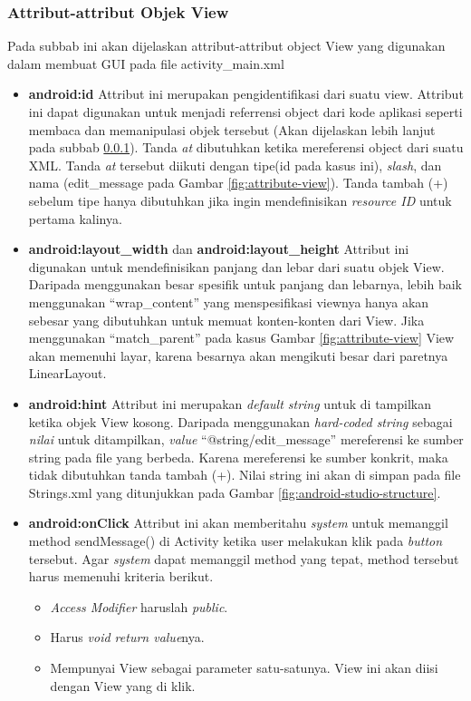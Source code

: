 \subsubsection{Attribut-attribut Objek View}
Pada subbab ini akan dijelaskan attribut-attribut object View yang digunakan dalam membuat GUI pada file activity\_main.xml
\begin{itemize}
	\item \textbf{android:id}
	Attribut ini merupakan pengidentifikasi dari suatu view. Attribut ini dapat digunakan untuk menjadi referrensi object dari kode aplikasi seperti membaca dan memanipulasi objek tersebut (Akan dijelaskan lebih lanjut pada subbab \ref{}). Tanda \textit{at} dibutuhkan ketika mereferensi object dari suatu XML. Tanda \textit{at} tersebut diikuti dengan tipe(id pada kasus ini), \textit{slash}, dan nama (edit\_message pada Gambar \ref{fig:attribute-view}). Tanda tambah (+) sebelum tipe hanya dibutuhkan jika ingin mendefinisikan \textit{resource ID} untuk pertama kalinya.
	\item \textbf{android:layout\_width} dan \textbf{android:layout\_height}
	Attribut ini digunakan untuk mendefinisikan panjang dan lebar dari suatu objek View. Daripada menggunakan besar spesifik untuk panjang dan lebarnya, lebih baik menggunakan "`wrap\_content"' yang menspesifikasi viewnya hanya akan sebesar yang dibutuhkan untuk memuat konten-konten dari View. Jika menggunakan "`match\_parent"' pada kasus Gambar \ref{fig:attribute-view} View akan memenuhi layar, karena besarnya akan mengikuti besar dari paretnya LinearLayout.
	\item \textbf{android:hint}
	Attribut ini merupakan \textit{default string} untuk di tampilkan ketika objek View kosong. Daripada menggunakan \textit{hard-coded string} sebagai \textit{nilai} untuk ditampilkan, \textit{value} "`@string/edit\_message"' mereferensi ke sumber string pada file yang berbeda. Karena mereferensi ke sumber konkrit, maka tidak dibutuhkan tanda tambah (+). Nilai string ini akan di simpan pada file Strings.xml yang ditunjukkan pada Gambar \ref{fig:android-studio-structure}.
	\item \textbf{android:onClick}
	Attribut ini akan memberitahu \textit{system} untuk memanggil method sendMessage() di Activity ketika user melakukan klik pada \textit{button} tersebut. Agar \textit{system} dapat memanggil method yang tepat, method tersebut harus memenuhi kriteria berikut.
	\begin{itemize}
		\item \textit{Access Modifier} haruslah \textit{public}.
		\item Harus \textit{void return value}nya.
		\item Mempunyai View sebagai parameter satu-satunya. View ini akan diisi dengan View yang di klik.
	\end{itemize}

\end{itemize}
